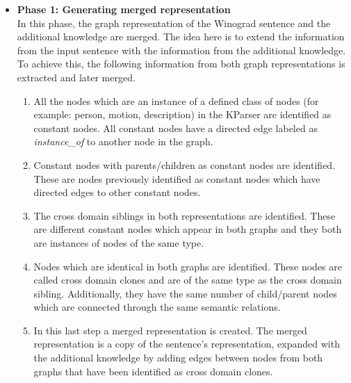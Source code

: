 \begin{itemize}
	\item \textbf{Phase 1: Generating merged representation}\\
	 In this phase, the graph representation of the Winograd sentence and the additional knowledge are merged. The idea here is to extend the information from the input sentence with the information from the additional knowledge. To achieve this, the following information from both graph representations is extracted and later merged.
	\begin{enumerate}
		\item All the nodes which are an instance of a defined class of nodes (for example: person, motion, description) in the KParser are identified as constant nodes. All constant nodes have a directed edge labeled as \textit{instance\_of} to another node in the graph. 
		\item Constant nodes with parents/children as constant nodes are identified. These are nodes  previously identified as constant nodes which have directed edges to other constant nodes.
		\item The cross domain siblings in both representations are identified. These are different constant nodes which appear in both graphs and they both are instances of nodes of the same type. 
		\item Nodes which are identical in both graphs are identified. These nodes are called cross domain clones and are of the same type as the cross domain sibling. Additionally, they have the same number of child/parent nodes which are connected through the same semantic relations. 
		\item In this last step a merged representation is created. The merged representation is a copy of the sentence's representation, expanded with the additional knowledge by adding edges between nodes from both graphs that have been identified as cross domain clones.
	\end{enumerate}


\end{itemize}
